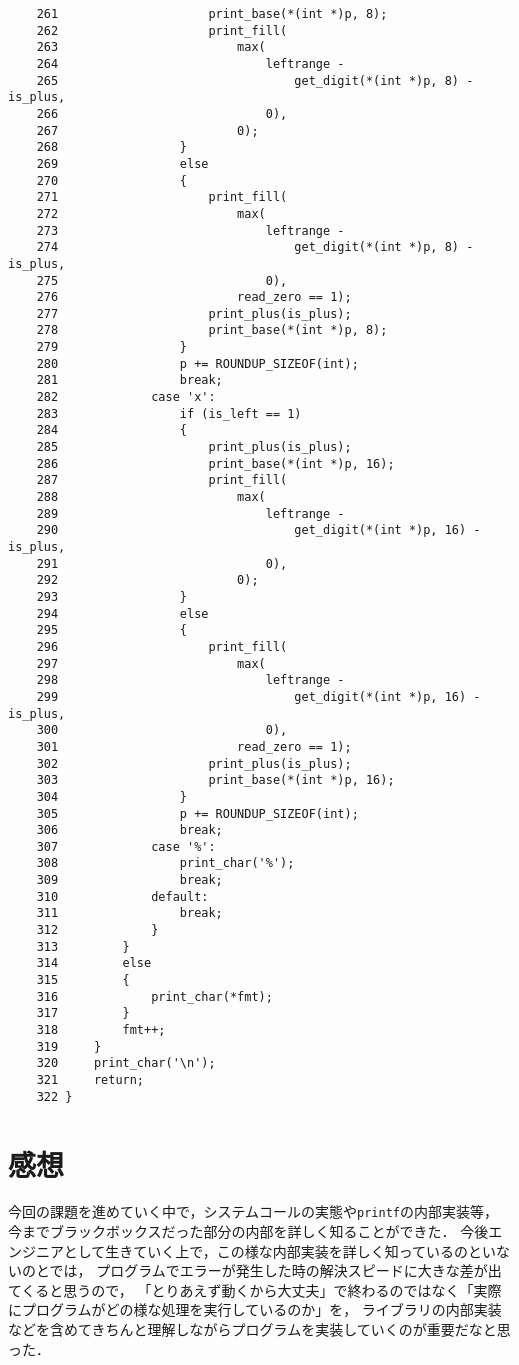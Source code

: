 \documentclass[a4j,11pt]{jarticle}
\begin{document}
\begin{verbatim}
    261	                    print_base(*(int *)p, 8);
    262	                    print_fill(
    263	                        max(
    264	                            leftrange -
    265	                                get_digit(*(int *)p, 8) - is_plus,
    266	                            0),
    267	                        0);
    268	                }
    269	                else
    270	                {
    271	                    print_fill(
    272	                        max(
    273	                            leftrange -
    274	                                get_digit(*(int *)p, 8) - is_plus,
    275	                            0),
    276	                        read_zero == 1);
    277	                    print_plus(is_plus);
    278	                    print_base(*(int *)p, 8);
    279	                }
    280	                p += ROUNDUP_SIZEOF(int);
    281	                break;
    282	            case 'x':
    283	                if (is_left == 1)
    284	                {
    285	                    print_plus(is_plus);
    286	                    print_base(*(int *)p, 16);
    287	                    print_fill(
    288	                        max(
    289	                            leftrange -
    290	                                get_digit(*(int *)p, 16) - is_plus,
    291	                            0),
    292	                        0);
    293	                }
    294	                else
    295	                {
    296	                    print_fill(
    297	                        max(
    298	                            leftrange -
    299	                                get_digit(*(int *)p, 16) - is_plus,
    300	                            0),
    301	                        read_zero == 1);
    302	                    print_plus(is_plus);
    303	                    print_base(*(int *)p, 16);
    304	                }
    305	                p += ROUNDUP_SIZEOF(int);
    306	                break;
    307	            case '%':
    308	                print_char('%');
    309	                break;
    310	            default:
    311	                break;
    312	            }
    313	        }
    314	        else
    315	        {
    316	            print_char(*fmt);
    317	        }
    318	        fmt++;
    319	    }
    320	    print_char('\n');
    321	    return;
    322	} 
\end{verbatim}



\section{感想}
今回の課題を進めていく中で，システムコールの実態や{\tt printf}の内部実装等，
今までブラックボックスだった部分の内部を詳しく知ることができた．
今後エンジニアとして生きていく上で，この様な内部実装を詳しく知っているのといないのとでは，
プログラムでエラーが発生した時の解決スピードに大きな差が出てくると思うので，
「とりあえず動くから大丈夫」で終わるのではなく「実際にプログラムがどの様な処理を実行しているのか」を，
ライブラリの内部実装などを含めてきちんと理解しながらプログラムを実装していくのが重要だなと思った．
\end{document}
